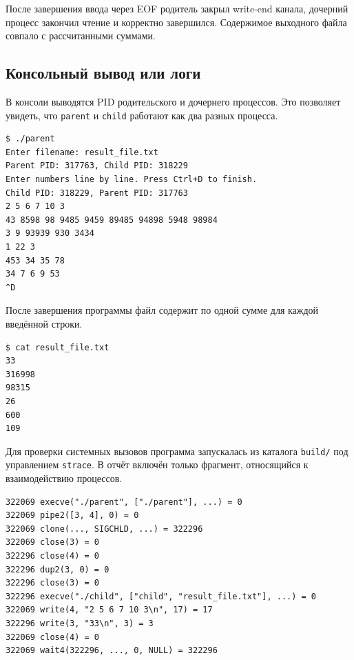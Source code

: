 \documentclass[12pt,a4paper]{article}
\begin{document}
После завершения ввода через EOF родитель закрыл write-end канала, дочерний процесс закончил чтение и корректно завершился. Содержимое выходного файла совпало с рассчитанными суммами.

\subsection{Консольный вывод или логи}

В консоли выводятся PID родительского и дочернего процессов. Это позволяет увидеть, что \texttt{parent} и \texttt{child} работают как два разных процесса.

\begin{lstlisting}[style=terminal,caption={Пример успешного запуска программы},label={lst:console-run}]
$ ./parent
Enter filename: result_file.txt
Parent PID: 317763, Child PID: 318229
Enter numbers line by line. Press Ctrl+D to finish.
Child PID: 318229, Parent PID: 317763
2 5 6 7 10 3
43 8598 98 9485 9459 89485 94898 5948 98984
3 9 93939 930 3434
1 22 3
453 34 35 78
34 7 6 9 53
^D
\end{lstlisting}

\noindent\begin{minipage}{\linewidth}
После завершения программы файл содержит по одной сумме для каждой введённой строки.

\begin{lstlisting}[style=terminal,caption={Проверка содержимого выходного файла},label={lst:result-file}]
$ cat result_file.txt
33
316998
98315
26
600
109
\end{lstlisting}
\end{minipage}

Для проверки системных вызовов программа запускалась из каталога \texttt{build/} под управлением \texttt{strace}. В отчёт включён только фрагмент, относящийся к взаимодействию процессов.

\begin{lstlisting}[style=terminal,caption={Ключевые системные вызовы из трассировки strace},label={lst:strace}]
322069 execve("./parent", ["./parent"], ...) = 0
322069 pipe2([3, 4], 0) = 0
322069 clone(..., SIGCHLD, ...) = 322296
322069 close(3) = 0
322296 close(4) = 0
322296 dup2(3, 0) = 0
322296 close(3) = 0
322296 execve("./child", ["child", "result_file.txt"], ...) = 0
322069 write(4, "2 5 6 7 10 3\n", 17) = 17
322296 write(3, "33\n", 3) = 3
322069 close(4) = 0
322069 wait4(322296, ..., 0, NULL) = 322296
\end{lstlisting}
\end{document}
